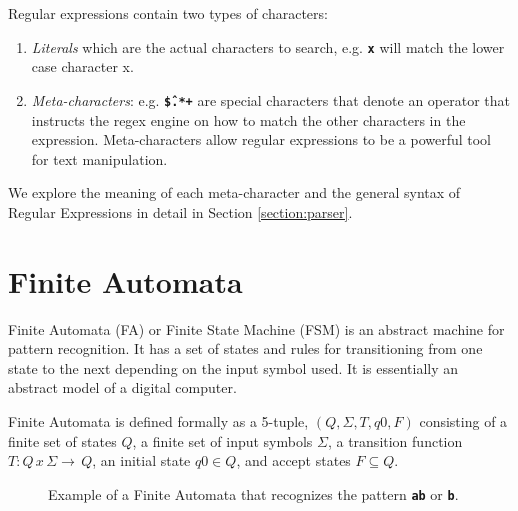 Regular expressions contain two types of characters:
\begin{enumerate}
    \item \textit{Literals} which are the actual characters to search, e.g. \texttt{\textbf{x}} will match the lower case character x.
    \item \textit{Meta-characters}: e.g. \texttt{\textbf{\^\$.*+}} are special characters that denote an operator that instructs the regex engine on how to match the other characters in the expression. Meta-characters allow regular expressions to be a powerful tool for text manipulation.
\end{enumerate}

We explore the meaning of each meta-character and the general syntax of Regular Expressions in detail in Section \ref{section:parser}. 


\section{Finite Automata}

Finite Automata (FA) or Finite State Machine (FSM) is an abstract machine for pattern recognition. It has a set of states and rules for transitioning from one state to the next depending on the input symbol used. It is essentially an abstract model of a digital computer. 

Finite Automata is defined formally as a 5-tuple, $(Q, Σ, T, q0, F)$ consisting of a finite set of states $Q$, a finite set of input symbols $\Sigma$, a transition function $T: Q \, x \, Σ → \, Q$, an initial state $q0 ∈ Q$, and accept states $F \subseteq Q$.

\begin{figure}[H]
\centering
{}
\caption{Example of a Finite Automata that recognizes the pattern \texttt{\textbf{ab}} or \texttt{\textbf{b}}.}
\label{fig:fsm}
\end{figure}

